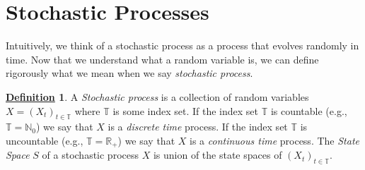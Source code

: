 \documentclass[12pt]{book}
\numberwithin{equation}{chapter}
\theoremstyle{plain}
\numberwithin{theorem}{section}
\theoremstyle{definition}
\newtheorem{definition}[theorem]{\underline{Definition}}
\numberwithin{exercise}{chapter}
\newcommand{\<}{\langle}
\renewcommand{\>}{\rangle}
\renewcommand{\(}{\left(}
\renewcommand{\)}{\right)}
\renewcommand{\[}{\left[}
\renewcommand{\]}{\right]}
\newcommand\Pb{\mathds{P}}
\newcommand\Rb{\mathds{R}}
\newcommand\Nb{\mathds{N}}
\newcommand\Bc{\mathscr{B}}
\newcommand\Fc{\mathscr{F}}
\newcommand\om{\omega}
\newcommand\Om{\Omega}
\begin{document}

%
%


\section{Stochastic Processes}

Intuitively, we think of a stochastic process as a process that evolves randomly in time.  Now that we understand what a random variable is, we can define rigorously what we mean when we say \textit{stochastic process}.

\begin{definition}
A \textit{Stochastic process} is a collection of random variables $X = (X_t)_{t \in \mathds{T}}$ where $\mathds{T}$ is some index set.
If the index set $\mathds{T}$ is countable (e.g., $\mathds{T} = \Nb_0$) we say that $X$ is a \textit{discrete time} process.
If the index set $\mathds{T}$ is uncountable (e.g., $\mathds{T} = \Rb_+$) we say that $X$ is a \textit{continuous time} process.
The \textit{State Space} $S$ of a stochastic process $X$ is union of the state spaces of $(X_t)_{t \in \mathds{T}}$.
\end{definition}
\end{document}
